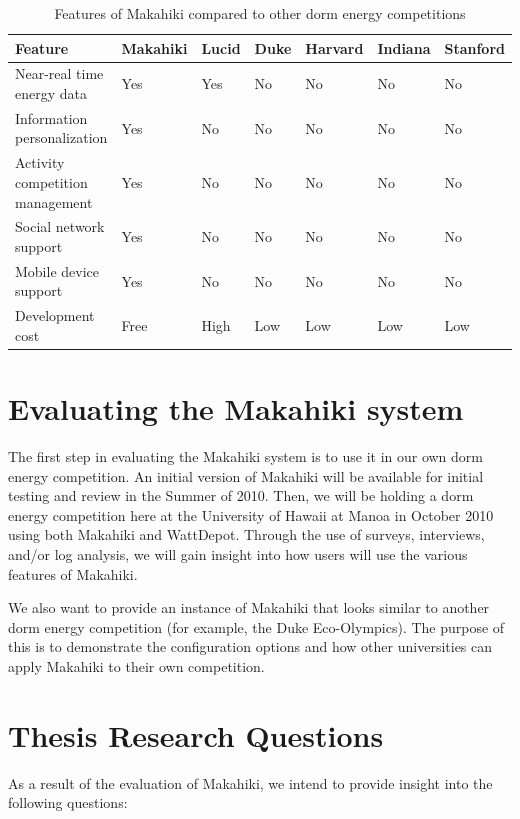 \begin{table}[h]
	\begin{tabular}{| l || l | l | l | l | l | l | }
		\hline
		Feature & Makahiki & Lucid & Duke & Harvard & Indiana & Stanford \\
		\hline
		Near-real time energy data & Yes & Yes & No & No & No & No \\
		Information personalization & Yes & No & No & No & No & No \\
		Activity competition management & Yes & No & No & No & No & No\\
		Social network support & Yes & No & No & No & No & No\\
		Mobile device support & Yes & No & No & No & No & No \\
		Development cost & Free & High & Low & Low & Low & Low \\
		\hline
	\end{tabular}
	\caption{Features of Makahiki compared to other dorm energy competitions}
	\label{feature-comparison}
\end{table}

\section{Evaluating the Makahiki system}

The first step in evaluating the Makahiki system is to use it in our own dorm energy competition.  An initial version of Makahiki will be available for initial testing and review in the Summer of 2010.  Then, we will be holding a dorm energy competition here at the University of Hawaii at Manoa in October 2010 using both Makahiki and WattDepot.  Through the use of surveys, interviews, and/or log analysis, we will gain insight into how users will use the various features of Makahiki.

We also want to provide an instance of Makahiki that looks similar to another dorm energy competition (for example, the Duke Eco-Olympics).  The purpose of this is to demonstrate the configuration options and how other universities can apply Makahiki to their own competition.

\section{Thesis Research Questions}

As a result of the evaluation of Makahiki, we intend to provide insight into the following questions:

